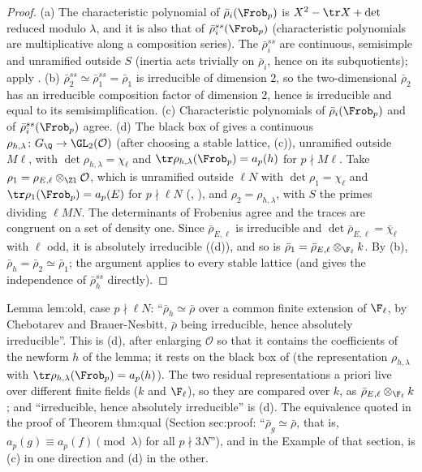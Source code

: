 \begin{proof}
(a) The characteristic polynomial of $\bar\rho_i(\Frob_p)$ is $X^2-\tr X+\det$ reduced modulo $\lambda$, and it is also that of $\bar\rho_i^{ss}(\Frob_p)$ (characteristic
polynomials are multiplicative along a composition series). The $\bar\rho_i^{ss}$ are continuous, semisimple and unramified outside $S$ (inertia acts trivially on
$\bar\rho_i$, hence on its subquotients); apply .
(b) $\bar\rho_2^{ss}\simeq\bar\rho_1^{ss}=\bar\rho_1$ is irreducible of dimension $2$, so the two-dimensional $\bar\rho_2$ has an irreducible composition factor of
dimension $2$, hence is irreducible and equal to its semisimplification.
(c) Characteristic polynomials of $\bar\rho_i(\Frob_p)$ and of $\bar\rho_i^{ss}(\Frob_p)$ agree.
(d) The black box of  gives a continuous $\rho_{h,\lambda}\colon G_\Q\to\GL_2(\mathcal{O})$ (after choosing a stable lattice,
(c)), unramified outside $M\ell$, with $\det\rho_{h,\lambda}=\chi_\ell$ and $\tr\rho_{h,\lambda}(\Frob_p)=a_p(h)$ for $p\nmid M\ell$. Take
$\rho_1=\rho_{E,\ell}\otimes_{\Zl}\mathcal{O}$, which is unramified outside $\ell N$ with $\det\rho_1=\chi_\ell$ and $\tr\rho_1(\Frob_p)=a_p(E)$ for $p\nmid\ell N$
(, ), and $\rho_2=\rho_{h,\lambda}$, with $S$ the primes dividing $\ell MN$. The determinants of Frobenius agree and the traces are
congruent on a set of density one. Since $\bar\rho_{E,\ell}$ is irreducible and $\det\bar\rho_{E,\ell}=\bar\chi_\ell$ with $\ell$ odd, it is absolutely irreducible
((d)), and so is $\bar\rho_1=\bar\rho_{E,\ell}\otimes_{\F_\ell}k$. By (b), $\bar\rho_h=\bar\rho_2\simeq\bar\rho_1$; the argument
applies to every stable lattice (and  gives the independence of $\bar\rho_h^{ss}$ directly).
\end{proof}

\begin{paperlink}
Lemma lem:old, case $p\nmid\ell N$: ``$\bar\rho_h\simeq\bar\rho$ over a common finite extension of $\F_\ell$, by Chebotarev and Brauer-Nesbitt, $\bar\rho$ being irreducible,
hence absolutely irreducible''. This is (d), after enlarging $\mathcal{O}$ so that it contains the coefficients of the newform $h$ of the
lemma; it rests on the black box of  (the representation $\rho_{h,\lambda}$ with $\tr\rho_{h,\lambda}(\Frob_p)=a_p(h)$). The two residual representations
a priori live over different finite fields ($k$ and $\F_\ell$), so they are compared over $k$, as $\bar\rho_{E,\ell}\otimes_{\F_\ell}k$; and ``irreducible, hence absolutely
irreducible'' is (d). The equivalence quoted in the proof of Theorem thm:qual
(Section sec:proof: ``$\bar\rho_g\simeq\bar\rho$, that is, $a_p(g)\equiv a_p(f)\pmod\lambda$ for all $p\nmid 3N$''), and in the Example of that section, is (c) in one
direction and (d) in the other.
\end{paperlink}

